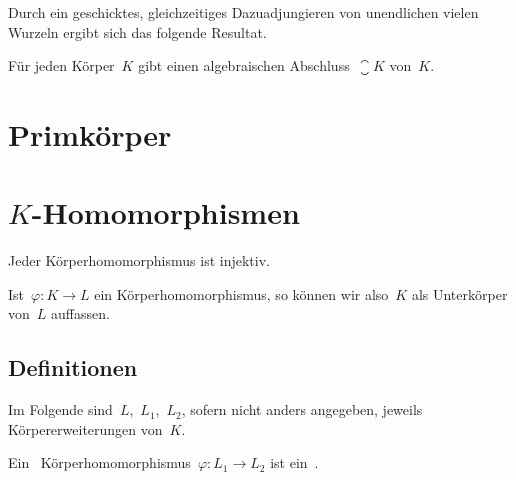Durch ein geschicktes, gleichzeitiges Dazuadjungieren von unendlichen vielen Wurzeln ergibt sich das folgende Resultat.

\begin{theorem}[Steinitz]
  Für jeden Körper~$K$ gibt einen algebraischen Abschluss~$\closure{K}$ von~$K$.
\end{theorem}





\clearpage





\section{Primkörper}






\section{\texorpdfstring{$K$}{K}-Homomorphismen}

\begin{proposition}
  Jeder Körperhomomorphismus ist injektiv.
\end{proposition}

\begin{remark}
  Ist~$\varphi \colon K \to L$ ein Körperhomomorphismus, so können wir also~$K$ als Unterkörper von~$L$ auffassen.
\end{remark}



\subsection{Definitionen}

\begin{convention}
  Im Folgende sind~$L$,~$L_1$,~$L_2$, sofern nicht anders angegeben, jeweils Körpererweiterungen von~$K$.
\end{convention}

\begin{definition}
  Ein~ Körperhomomorphismus~$\varphi \colon L_1 \to L_2$ ist ein~.
\end{definition}

